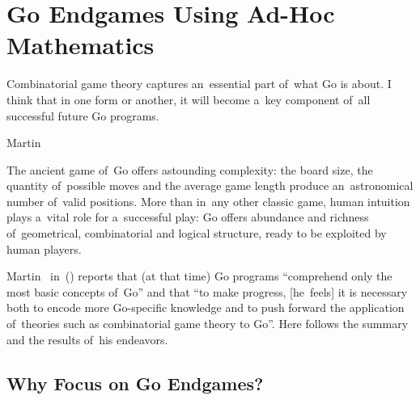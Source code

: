 \chapter{Go Endgames Using Ad-Hoc Mathematics}
\epigraph{
  Combinatorial game theory captures an~essential part of~what Go is about.
  I think that in one form or another, it will become a~key component of~all successful future Go programs.%
  \footnotemark
}{Martin~\cite{Muller1995computer}}
The ancient game of~Go offers astounding complexity:
the board size, the quantity of~possible moves and the average game length produce an~astronomical number of~valid positions.
More than in~any other classic game, human intuition plays a~vital role for a~successful play:
Go offers abundance and richness of~geometrical, combinatorial and logical structure, ready to be exploited by human players.


Martin~\Mueller{} in~(\cite{Muller1995computer}) reports that (at that time) Go programs ``comprehend only the most basic concepts of~Go'' and that
``to make progress, [he~feels] it is necessary both to encode more Go-specific knowledge and to push forward the application of~theories such as combinatorial game theory to Go''.
Here follows the summary and the results of~his endeavors.

\section{Why Focus on Go Endgames?}

